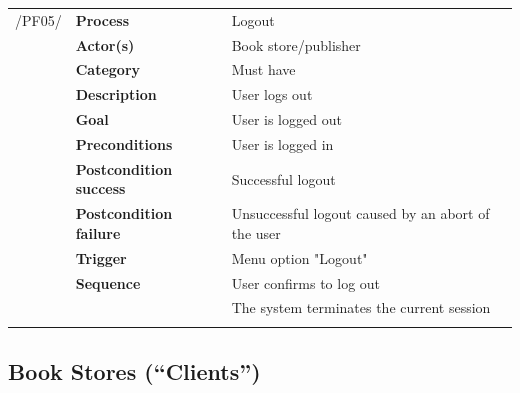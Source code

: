 \documentclass[11pt,a4paper,oneside,svgnames]{report}
\begin{document}
\noindent
\begin{tabular}{p{1.5cm}p{3cm}p{8cm}}
\cellcolor{white}/PF05/	& \textbf{Process} & Logout\\
\cellcolor{white}		& \textbf{Actor(s)} & Book store/publisher\\
\cellcolor{white}		& \textbf{Category} & Must have\\
\cellcolor{white}		& \textbf{Description}	 & User logs out\\
\cellcolor{white}		& \textbf{Goal} & User is logged out\\
\cellcolor{white}		& \textbf{Preconditions} & User is logged in\\
\cellcolor{white}		& \textbf{Postcondition success} & Successful logout\\
\cellcolor{white}		& \textbf{Postcondition failure} & Unsuccessful logout caused by an abort of the user\\
\cellcolor{white}		& \textbf{Trigger} & Menu option "Logout"\\
\cellcolor{white}		& \textbf{Sequence} & User confirms to log out\\
\cellcolor{white}		& & The system terminates the current session\\
\cellcolor{white}\hfill \\
\end{tabular}


\subsection{Book Stores (``Clients'')}
\end{document}
